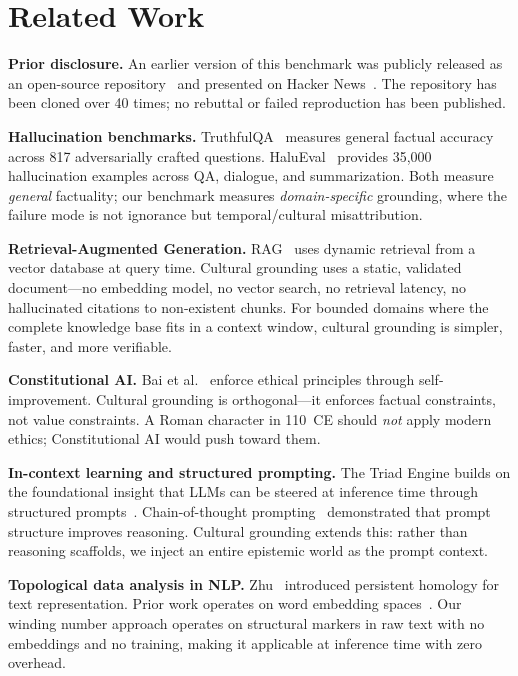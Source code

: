 \documentclass[11pt,a4paper]{article}
\begin{document}
\section{Related Work}

\textbf{Prior disclosure.} An earlier version of this benchmark was publicly
released as an open-source repository~\cite{hohman2025benchmark} and
presented on Hacker News~\cite{hohman2025triad}. The repository has been
cloned over 40 times; no rebuttal or failed reproduction has been published.

\textbf{Hallucination benchmarks.} TruthfulQA~\cite{lin2022truthfulqa}
measures general factual accuracy across 817 adversarially crafted questions.
HaluEval~\cite{li2023halueval} provides 35,000 hallucination examples across
QA, dialogue, and summarization. Both measure \emph{general} factuality; our
benchmark measures \emph{domain-specific} grounding, where the failure mode
is not ignorance but temporal/cultural misattribution.

\textbf{Retrieval-Augmented Generation.} RAG~\cite{lewis2020retrieval} uses
dynamic retrieval from a vector database at query time. Cultural grounding
uses a static, validated document---no embedding model, no vector search, no
retrieval latency, no hallucinated citations to non-existent chunks. For
bounded domains where the complete knowledge base fits in a context window,
cultural grounding is simpler, faster, and more verifiable.

\textbf{Constitutional AI.} Bai et al.~\cite{bai2022constitutional} enforce
ethical principles through self-improvement. Cultural grounding is
orthogonal---it enforces factual constraints, not value constraints. A Roman
character in 110~CE should \emph{not} apply modern ethics; Constitutional AI
would push toward them.

\textbf{In-context learning and structured prompting.} The Triad Engine
builds on the foundational insight that LLMs can be steered at inference time
through structured prompts~\cite{brown2020language}. Chain-of-thought
prompting~\cite{wei2022chain} demonstrated that prompt structure improves
reasoning. Cultural grounding extends this: rather than reasoning scaffolds,
we inject an entire epistemic world as the prompt context.

\textbf{Topological data analysis in NLP.} Zhu~\cite{zhu2013persistent}
introduced persistent homology for text representation. Prior work operates
on word embedding spaces~\cite{brown2020language}. Our winding number
approach operates on structural markers in raw text with no embeddings and no
training, making it applicable at inference time with zero overhead.
\end{document}
